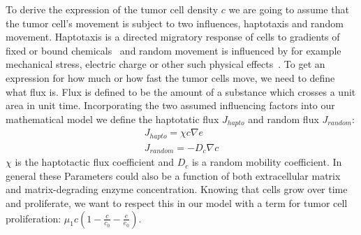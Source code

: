 To derive the expression of the tumor cell density $c$ we are going to assume that the tumor cell's movement is subject to two influences, haptotaxis and random movement. Haptotaxis is a directed migratory response of cells to gradients of fixed or bound chemicals~\cite{anderson_continuous_1998} and random movement is influenced by for example mechanical stress, electric charge or other such physical effects~\cite{Merino-Casallo2022-di}. To get an expression for how much or how fast the tumor cells move, we need to define what flux is. Flux is defined to be the amount of a substance  which crosses a unit area in unit time. Incorporating the two assumed influencing factors into our mathematical model we define the haptotatic flux $J_{hapto}$ and random flux $J_{random}$:
\begin{align*}
    J_{hapto} = \chi c \nabla e \\
    J_{random} = -D_c \nabla c
\end{align*}
$\chi$ is the haptotactic flux coefficient and $D_c$ is a random mobility coefficient. In general these Parameters could also be a function of both extracellular matrix and matrix-degrading enzyme concentration. Knowing that cells grow over time and proliferate, we want to respect this in our model with a term for tumor cell proliferation: $\mu_1 c (1-\frac{c}{c_0} - \frac{e}{e_0})$.

